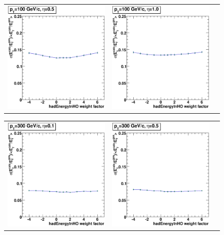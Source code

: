 \documentclass{cmspaper}
\begin{document}
\begin{appendices}
\begin{center}
\begin{tabular}{lll}
 \includegraphics[width=2in]{figs/ET_res_vs_HO_wght_eta0.5_pT100.eps} &
 \includegraphics[width=2in]{figs/ET_res_vs_HO_wght_eta1.0_pT100.eps} \\
\end{tabular}
\end{center}
\begin{center}
\begin{tabular}{lll}
 \includegraphics[width=2in]{figs/ET_res_vs_HO_wght_eta0.1_pT300.eps} &
 \includegraphics[width=2in]{figs/ET_res_vs_HO_wght_eta0.5_pT300.eps} &

\end{tabular}
\end{center}
\end{appendices}
\end{document}
